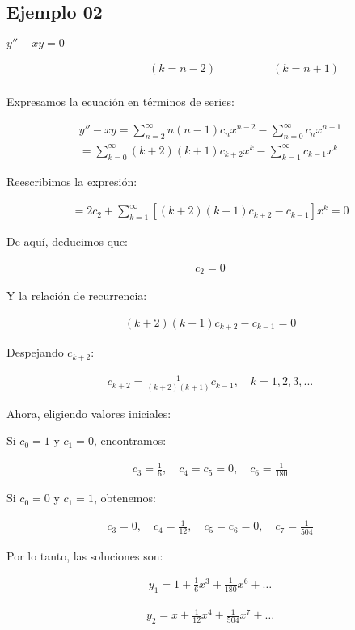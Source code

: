 \subsection{Ejemplo 02}

\textcolor[rgb]{0.82,0.01,0.11}{\( y'' - xy = 0 \)}

\begin{gather*}
\quad \quad \quad \quad \quad \quad ( k = n-2) \quad \quad \quad \quad \quad ( k = n+1) \\
\end{gather*}

Expresamos la ecuación en términos de series:

\begin{gather*}
y'' - xy = \sum _{n=2}^{\infty } n( n-1) c_{n} x^{n-2} -\sum _{n=0}^{\infty } c_{n} x^{n+1} \\
= \sum _{k=0}^{\infty }( k+2)( k+1) c_{k+2} x^{k} -\sum _{k=1}^{\infty } c_{k-1} x^{k}
\end{gather*}

Reescribimos la expresión:

\begin{gather*}
= 2c_{2} + \sum _{k=1}^{\infty }[( k+2)( k+1) c_{k+2} - c_{k-1}] x^{k} = 0
\end{gather*}

De aquí, deducimos que:

\begin{gather*}
c_{2} = 0
\end{gather*}

Y la relación de recurrencia:

\begin{gather*}
( k+2)( k+1) c_{k+2} - c_{k-1} = 0
\end{gather*}

Despejando \( c_{k+2} \):

\begin{gather*}
c_{k+2} = \frac{1}{( k+2)( k+1)} c_{k-1}, \quad k=1,2,3,...
\end{gather*}

Ahora, eligiendo valores iniciales:

Si \( c_0 = 1 \) y \( c_1 = 0 \), encontramos:

\begin{gather*}
c_{3} = \frac{1}{6}, \quad c_{4} = c_{5} = 0, \quad c_{6} = \frac{1}{180}
\end{gather*}

Si \( c_0 = 0 \) y \( c_1 = 1 \), obtenemos:

\begin{gather*}
c_{3} = 0, \quad c_{4} = \frac{1}{12}, \quad c_{5} = c_{6} = 0, \quad c_{7} = \frac{1}{504}
\end{gather*}

Por lo tanto, las soluciones son:

\begin{gather*}
y_{1} = 1 + \frac{1}{6} x^{3} + \frac{1}{180} x^{6} + \dots
\end{gather*}

\begin{gather*}
y_{2} = x + \frac{1}{12} x^{4} + \frac{1}{504} x^{7} + \dots
\end{gather*}


